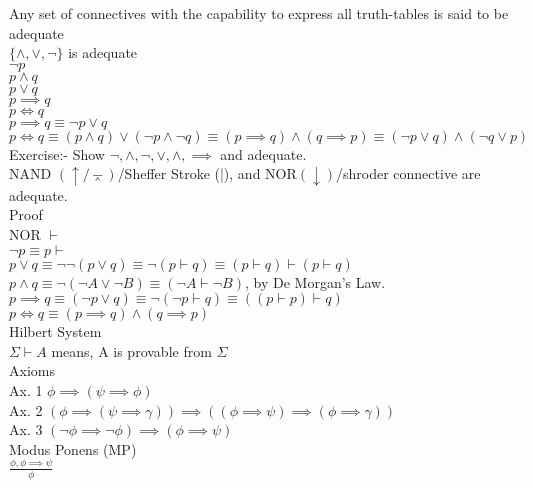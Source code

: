 \documentclass[12pt,oneside,fleqn]{article}
\theoremstyle{definition}
\begin{document}
Any set of connectives with the capability to express all truth-tables is said to be adequate \\
$\{ \land , \lor , \neg \}$ is adequate \\
$\neg p$ \\
$p \land q$ \\
$p \lor q$ \\
$p \implies q$ \\
$p \iff q$ \\
$p \implies q \equiv \neg p \lor q$ \\
$p \iff q \equiv (p \land q) \lor (\neg p \land \neg q) \equiv (p  \implies q) \land (q \implies p) \equiv (\neg p \lor q) \land (\neg q \lor p)$ \\

Exercise:- Show ${\neg, \land}, {\neg, \lor}, {\land, \implies}$ and adequate. \\ 
NAND $(\uparrow / \barwedge)$/Sheffer Stroke (|), and NOR$(\downarrow )$/shroder connective are adequate. \\

Proof \\
NOR $\vdash$ \\
$\neg p \equiv p \vdash$ \\
$p \lor q \equiv \neg \neg (p \lor q) \equiv \neg (p \vdash q) \equiv (p \vdash q) \vdash (p \vdash q)$ \\
$p \land q \equiv \neg (\neg A \lor \neg B) \equiv (\neg A \vdash \neg B)$, by De Morgan's Law. \\
$p \implies q \equiv (\neg p \lor q) \equiv \neg (\neg p \vdash q) \equiv ((p \vdash p) \vdash q)$ \\
$p \iff q \equiv (p \implies q) \land (q \implies p)$ \\

Hilbert System \\
$\Sigma \vdash A$ means, A is provable from $\Sigma$ \\
Axioms \\
Ax. 1 $\phi \implies (\psi \implies \phi)$ \\
Ax. 2 $(\phi \implies (\psi \implies \gamma)) \implies ((\phi \implies \psi) \implies (\phi \implies \gamma))$ \\
Ax. 3 $(\neg \phi \implies \neg \phi) \implies (\phi \implies \psi)$ \\

Modus Ponens (MP) \\
$\frac{\phi,\phi \implies \psi}{\phi}$ \\
\end{document}
